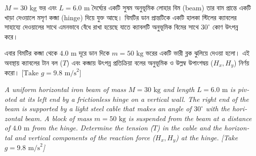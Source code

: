 \documentclass[12pt, a4paper]{article}
\begin{document}
\begin{tcolorbox}[questionbox={প্রশ্ন (Question) 20}]
\noindent
$M = 30\text{ kg}$ ভর এবং $L = 6.0\text{ m}$ দৈর্ঘ্যের একটি সুষম অনুভূমিক লোহার বিম (beam) তার বাম প্রান্তে একটি খাড়া দেওয়ালে মসৃণ কব্জা (hinge) দিয়ে যুক্ত আছে। বিমটির ডান প্রান্তটিকে একটি হালকা স্টিলের ক্যাবলের সাহায্যে দেওয়ালের সাথে এমনভাবে বেঁধে রাখা হয়েছে যাতে ক্যাবলটি অনুভূমিক বিমের সাথে $30^\circ$ কোণ উৎপন্ন করে। 

\vspace{0.3em}
\noindent
এবার বিমটির কব্জা থেকে $4.0\text{ m}$ দূরে ডান দিকে $m = 50\text{ kg}$ ভরের একটি ভারী ব্লক ঝুলিয়ে দেওয়া হলো। এই অবস্থায় ক্যাবলের টান বল ($T$) এবং কব্জায় উৎপন্ন প্রতিক্রিয়া বলের অনুভূমিক ও উল্লম্ব উপাংশদ্বয় ($H_x, H_y$) নির্ণয় করো। [$\text{Take } g = 9.8\text{ m/s}^2$]

\vspace{0.8em}
\begin{english}
\noindent\textit{\color{darkgray}
A uniform horizontal iron beam of mass $M = 30\text{ kg}$ and length $L = 6.0\text{ m}$ is pivoted at its left end by a frictionless hinge on a vertical wall. The right end of the beam is supported by a light steel cable that makes an angle of $30^\circ$ with the horizontal beam. A block of mass $m = 50\text{ kg}$ is suspended from the beam at a distance of $4.0\text{ m}$ from the hinge. Determine the tension ($T$) in the cable and the horizontal and vertical components of the reaction force ($H_x, H_y$) at the hinge. [Take $g = 9.8\text{ m/s}^2$]
}
\end{english}
\end{tcolorbox}
\end{document}
